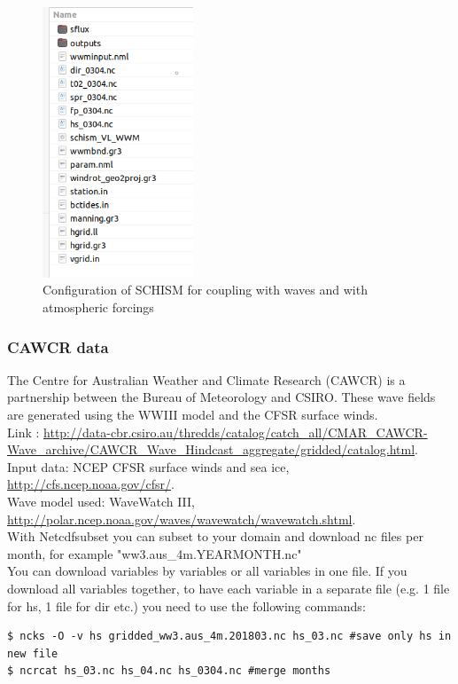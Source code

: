 \documentclass[preprints,briefreport,accept,oneauthor,pdftex]{Definitions/mdpi}
\begin{document}
\begin{figure}[b!]
    \centering
    \includegraphics[width=0.4\textwidth]{figures/wavefolder.png}
    \caption{Configuration of SCHISM for coupling with waves and with atmospheric forcings}
    \label{fig:wavefolder}
\end{figure}

\subsubsection{CAWCR data}
\noindent The Centre for Australian Weather and Climate Research (CAWCR) is a partnership between the Bureau of Meteorology and CSIRO. These wave fields are generated using the WWIII  model and the CFSR surface winds. \\
Link : \url{http://data-cbr.csiro.au/thredds/catalog/catch_all/CMAR_CAWCR-Wave_archive/CAWCR_Wave_Hindcast_aggregate/gridded/catalog.html}.\\
Input data: NCEP CFSR surface winds and sea ice, \url{http://cfs.ncep.noaa.gov/cfsr/}.\\
Wave model used: WaveWatch III, \url{http://polar.ncep.noaa.gov/waves/wavewatch/wavewatch.shtml}.\\

\noindent With Netcdfsubset you can subset to your domain and download nc files per month, for example "ww3.aus\_4m.YEARMONTH.nc"\\
You can download variables by variables or all variables in one file. If you download all variables together, to have each variable in a separate file (e.g. 1 file for hs, 1 file for dir etc.) you need to use the following commands:
\begin{lstlisting}
$ ncks -O -v hs gridded_ww3.aus_4m.201803.nc hs_03.nc #save only hs in new file
$ ncrcat hs_03.nc hs_04.nc hs_0304.nc #merge months
\end{lstlisting}
\end{document}
